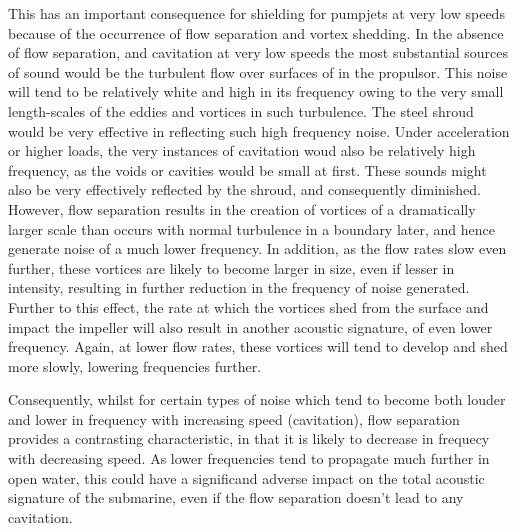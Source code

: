 \documentclass{article}\usepackage[]{graphicx}\usepackage[]{color}
\begin{document}
This has an important consequence for shielding for pumpjets at very low speeds because of the occurrence of flow separation and vortex shedding. In the absence of flow separation, and cavitation at very low speeds the most substantial sources of sound would be the turbulent flow over surfaces of in the propulsor.  This noise will tend to be relatively white and high in its frequency owing to the very small length-scales of the eddies and vortices in such turbulence.  The steel shroud would be very effective in reflecting such high frequency noise.  Under acceleration or higher loads, the very instances of cavitation woud also be relatively high frequency, as the voids or cavities would be small at first. These sounds might also be very effectively reflected by the shroud, and consequently diminished.  However, flow separation results in the creation of vortices of a dramatically larger scale than occurs with normal turbulence in a boundary later, and hence generate noise of a much lower frequency.  In addition, as the flow rates slow even further, these vortices are likely to become larger in size, even if lesser in intensity, resulting in further reduction in the frequency of noise generated.  Further to this effect, the rate at which the vortices shed from the surface and impact the impeller will also result in another acoustic signature, of even lower frequency.  Again, at lower flow rates, these vortices will tend to develop and shed more slowly, lowering frequencies further.

Consequently, whilst for certain types of noise which tend to become both louder and lower in frequency with increasing speed (cavitation), flow separation provides a contrasting characteristic, in that it is likely to decrease in frequecy with decreasing speed.  As lower frequencies tend to propagate much further in open water, this could have a significand adverse impact on the total acoustic signature of the submarine, even if the flow separation doesn't lead to any cavitation.
\end{document}
